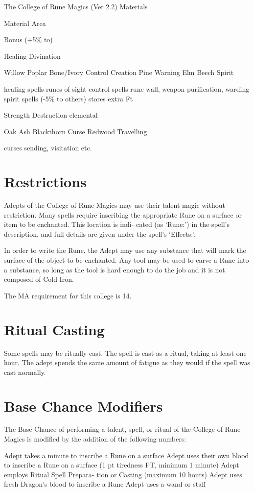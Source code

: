\begin{Chapter}{The College of Rune Magics (Ver 2.2)}
Materials 

Material  Area 

Bonus (+5\% to) 

Healing 
Divination 

Willow 
Poplar 
Bone/Ivory  Control 
Creation 
Pine 
Warning 
Elm 
Beech 
Spirit 

healing spells  
runes of sight  
control spells 
rune wall, weapon 
purification, warding 
spirit spells (-5\% to 
others)  
stores extra Ft 

Strength 
Destruction  elemental 

Oak 
Ash 
Blackthorn  Curse 
Redwood  Travelling 

curses 
sending, visitation etc. 


\section{Restrictions}

Adepts of the College of Rune Magics may use their talent magic
without restriction.  Many spells require inscribing the appropriate
Rune on a surface or item to be enchanted. This location is indi-
cated (as ‘Rune:’) in the spell’s description, and full details are
given under the spell’s ‘Effects:’.

In order to write the Rune, the Adept may use any substance that will
mark the surface of the object to be enchanted.  Any tool may be used
to carve a Rune into a substance, so long as the tool is hard enough
to do the job and it is not composed of Cold Iron.

The MA requirement for this college is 14. 


\section{Ritual Casting}

Some spells may be ritually cast.  The spell is cast as a ritual,
taking at least one hour.  The adept spends the same amount of fatigue
as they would if the spell was cast normally.


\section{Base Chance Modifiers}

The Base Chance of performing a talent, spell, or ritual of the
College of Rune Magics is modified by the addition of the following
numbers:

Adept takes a minute to inscribe a 
Rune on a surface 
Adept uses their own blood to inscribe 
a Rune on a surface (1 pt tiredness FT, 
minimum 1 minute) 
Adept employs Ritual Spell Prepara-
tion or Casting (maximum 10 hours) 
Adept uses fresh Dragon’s blood to 
inscribe a Rune 
Adept uses a wand or staff 


\end{Chapter}
